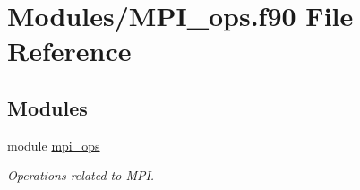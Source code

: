 \hypertarget{MPI__ops_8f90}{}\section{Modules/\+M\+P\+I\+\_\+ops.f90 File Reference}
\label{MPI__ops_8f90}
\subsection*{Modules}
\begin{DoxyCompactItemize}
\item 
module \hyperlink{namespacempi__ops}{mpi\+\_\+ops}
\begin{DoxyCompactList}\small\item\em Operations related to M\+PI. \end{DoxyCompactList}\end{DoxyCompactItemize}
